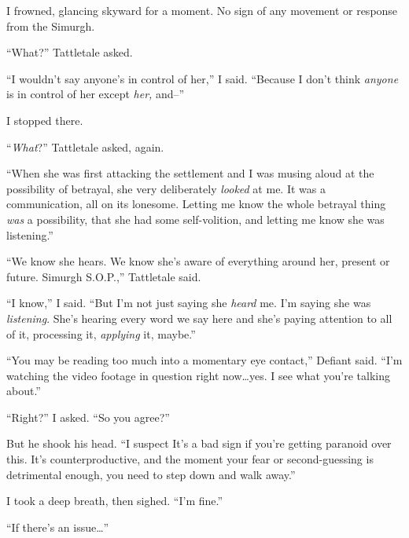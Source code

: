 I frowned, glancing skyward for a moment.  No sign of any movement or response from the Simurgh.



``What?'' Tattletale asked.



``I wouldn't say anyone's in control of her,'' I said.  ``Because I don't think \emph{anyone} is in control of her except \emph{her, }and--''



I stopped there.



``\emph{What}?'' Tattletale asked, again.



``When she was first attacking the settlement and I was musing aloud at the possibility of betrayal, she very deliberately \emph{looked} at me.  It was a communication, all on its lonesome.  Letting me know the whole betrayal thing \emph{was} a possibility, that she had some self-volition, and letting me know she was listening.''



``We know she hears.  We know she's aware of everything around her, present or future.  Simurgh S.O.P.,'' Tattletale said.



``I know,'' I said.  ``But I'm not just saying she \emph{heard} me.  I'm saying she was \emph{listening}.  She's hearing every word we say here and she's paying attention to all of it, processing it, \emph{applying} it, maybe.''



``You may be reading too much into a momentary eye contact,'' Defiant said.  ``I'm watching the video footage in question right now\ldots yes.  I see what you're talking about.''



``Right?'' I asked.  ``So you agree?''



But he shook his head.  ``I suspect It's a bad sign if you're getting paranoid over this.  It's counterproductive, and the moment your fear or second-guessing is detrimental enough, you need to step down and walk away.''



I took a deep breath, then sighed.  ``I'm fine.''



``If there's an issue\ldots''



